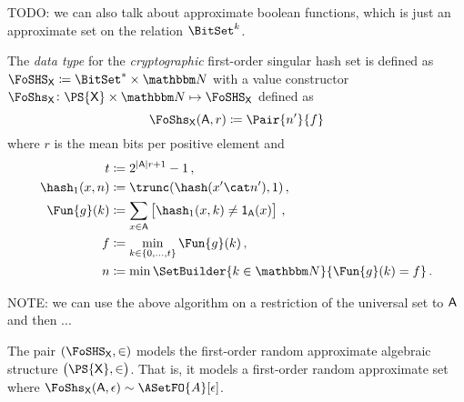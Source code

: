 \documentclass[ ../main.tex]{subfiles}
\begin{document}
TODO: we can also talk about approximate boolean functions, which is just an approximate set on the relation $\BitSet^k$.

\begin{definition}
    \label{alg:makeset}
    The \emph{data type} for the \emph{cryptographic} first-order singular hash set is defined as $\FoSHS_{\Set{X}} \coloneqq \BitSet^* \times \NatSet$ with a value constructor $\FoShs_{\Set{X}} \colon \PS{\Set{X}} \times \NatSet \mapsto \FoSHS_{\Set{X}}$ defined as
    \begin{equation}
        \FoShs_{\Set{X}}(\Set{A},r) \coloneqq \Pair{n'}{f}
    \end{equation}
    where $r$ is the mean bits per positive element and
    \begin{equation}
        \begin{split}
            t			& \coloneqq 2^{\Card{\Set{A}} r+1}-1\,,\\
            \hash_1(x,n)& \coloneqq \trunc(\hash(x' \cat n'),1)\,,\\	
            \Fun{g}(k) 	& \coloneqq \sum_{{x \in \Set{A}}}\left[\hash_1(x,k) \neq \SetIndicator{\Set{A}}(x)\right]\,,\\
            f 			& \coloneqq \min_{k \in \{0,\ldots,t\}} \Fun{g}(k)\,,\\
            n			& \coloneqq \min \SetBuilder{k \in \NatSet}{\Fun{g}(k) = f}\,.\\	
        \end{split}
    \end{equation}
\end{definition}


NOTE: we can use the above algorithm on a restriction of the universal set to $\Set{A}$ and then ...

The pair $\left(\FoSHS_{\Set{X}}, \SetContains\right)$ models the first-order random approximate algebraic structure $\left(\PS{\Set{X}},\SetContains\right)$.
That is, it models a first-order random approximate set where $\FoShs_{\Set{X}}(\Set{A},\epsilon) \sim \ASetFO{A}[\epsilon]$.
\end{document}
